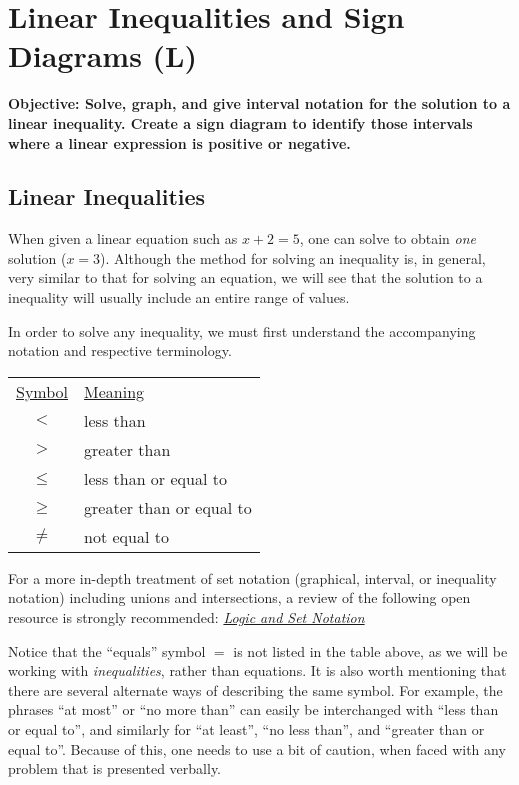 \documentclass[12pt]{book}
\theoremstyle{definition}
\begin{document}
\section{Linear Inequalities and Sign Diagrams (L)}\par
{\bf Objective: Solve, graph, and give interval notation for the solution to a linear inequality.  Create a sign diagram to identify those intervals where a linear expression is positive or negative.}
\subsection{Linear Inequalities}
When given a linear equation such as $x+2=5$, one can solve to obtain {\it one} solution ($x=3$).  Although the method for solving an inequality is, in general, very similar to that for solving an equation, we will see that the solution to a inequality will usually include an entire range of values.\par
In order to solve any inequality, we must first understand the accompanying notation and respective terminology.
\begin{center}
\begin{tabular}{cl}
\underline{Symbol} & \underline{Meaning}\\
$<$ & less than\\
$>$ & greater than\\
$\leq$ & less than or equal to\\
$\geq$ & greater than or equal to\\
$\neq$ & not equal to
\end{tabular}
\end{center}
For a more in-depth treatment of set notation (graphical, interval, or inequality notation) including unions and intersections, a review of the following open resource is strongly recommended: \href{http://msenux2.redwoods.edu/IntAlgText/chapter1/LogicSection.pdf}{\it{Logic and Set Notation}}\par
Notice that the ``equals'' symbol $=$ is not listed in the table above, as we will be working with {\it inequalities}, rather than equations.  It is also worth mentioning that there are several alternate ways of describing the same symbol.  For example, the phrases ``at most'' or ``no more than'' can easily be interchanged with ``less than or equal to'', and similarly for ``at least'', ``no less than'', and ``greater than or equal to''.  Because of this, one needs to use a bit of caution, when faced with any problem that is presented verbally. \par
\end{document}
